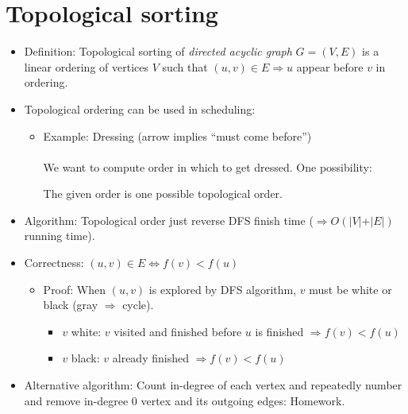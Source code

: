 \section{Topological sorting}
\begin{itemize}
	\item Definition: Topological sorting of {\em directed acyclic graph}
	$G=(V,E)$ is a linear ordering of vertices $V$ such that $(u,v) \in E
	\Rightarrow u$ appear before $v$ in ordering.
	\item Topological ordering can be used in scheduling:
	\begin{itemize}
		\item Example: Dressing (arrow implies ``must come before'') \\ \\
		
		We want to compute order in which to get dressed. One possibility: \\
		
		
		\vspace*{\baselineskip}
		
		The given order is one possible topological order.
	\end{itemize}
	\item Algorithm: Topological order just reverse DFS finish time ($
	\Rightarrow O(\vert V \vert + \vert E \vert)$ running time).
	\item Correctness: $(u,v) \in E \Leftrightarrow f(v) < f(u)$
	\begin{itemize}
		\item Proof: When $(u,v)$ is explored by DFS algorithm, $v$ must be
		white or black (gray $\Rightarrow$ cycle).
		\begin{itemize}
			\item $v$ white: $v$ visited and finished before $u$ is
			finished $\Rightarrow f(v) < f(u)$
			\item $v$ black: $v$ already finished $\Rightarrow f(v) <
			f(u)$
		\end{itemize}
	\end{itemize}
	\item Alternative algorithm: Count in-degree of each vertex and repeatedly
	number and remove in-degree 0 vertex and its outgoing edges: Homework. 
	
\end{itemize}
